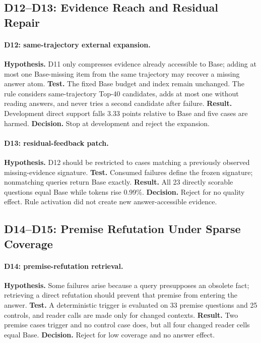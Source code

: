 \documentclass[10pt]{article}
\begin{document}
\subsection{D12--D13: Evidence Reach and Residual Repair}

\paragraph{D12: same-trajectory external expansion.}
\textbf{Hypothesis.} D11 only compresses evidence already accessible to Base; adding at most one Base-missing item from the same trajectory may recover a missing answer atom. \textbf{Test.} The fixed Base budget and index remain unchanged. The rule considers same-trajectory Top-40 candidates, adds at most one without reading answers, and never tries a second candidate after failure. \textbf{Result.} Development direct support falls 3.33 points relative to Base and five cases are harmed. \textbf{Decision.} Stop at development and reject the expansion.

\paragraph{D13: residual-feedback patch.}
\textbf{Hypothesis.} D12 should be restricted to cases matching a previously observed missing-evidence signature. \textbf{Test.} Consumed failures define the frozen signature; nonmatching queries return Base exactly. \textbf{Result.} All 23 directly scorable questions equal Base while tokens rise 0.99\%. \textbf{Decision.} Reject for no quality effect. Rule activation did not create new answer-accessible evidence.

\subsection{D14--D15: Premise Refutation Under Sparse Coverage}

\paragraph{D14: premise-refutation retrieval.}
\textbf{Hypothesis.} Some failures arise because a query presupposes an obsolete fact; retrieving a direct refutation should prevent that premise from entering the answer. \textbf{Test.} A deterministic trigger is evaluated on 33 premise questions and 25 controls, and reader calls are made only for changed contexts. \textbf{Result.} Two premise cases trigger and no control case does, but all four changed reader cells equal Base. \textbf{Decision.} Reject for low coverage and no answer effect.
\end{document}
